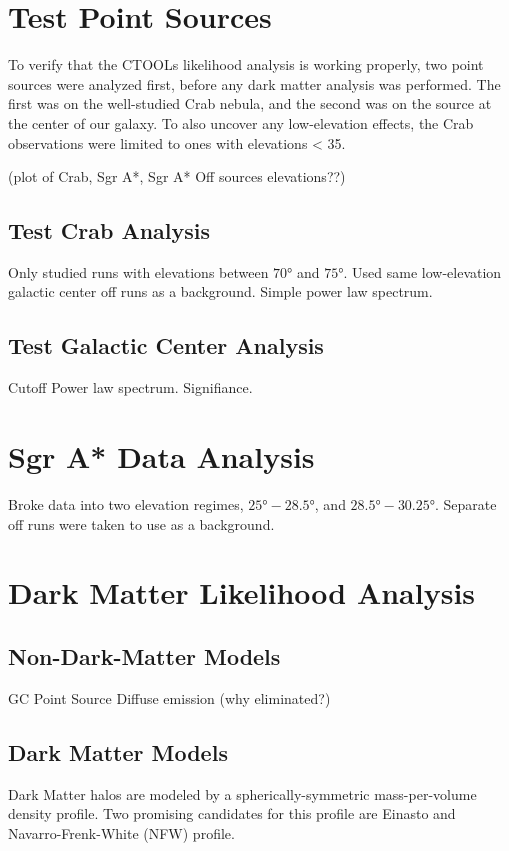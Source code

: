 \section{Test Point Sources}
To verify that the CTOOLs likelihood analysis is working properly, two point sources were analyzed first, before any dark matter analysis was performed.
The first was on the well-studied Crab nebula, and the second was on the source at the center of our galaxy.
To also uncover any low-elevation effects, the Crab observations were limited to ones with elevations < 35\degree.

(plot of Crab, Sgr A*, Sgr A* Off sources elevations??)

\subsection{Test Crab Analysis}

Only studied runs with elevations between $\ang{70}$ and $\ang{75}$.
Used same low-elevation galactic center off runs as a background.
Simple power law spectrum.

\subsection{Test Galactic Center Analysis}

Cutoff Power law spectrum.
Signifiance.

\section{Sgr A* Data Analysis}
Broke data into two elevation regimes, $ \ang{25}-\ang{28.5} $, and $ \ang{28.5}-\ang{30.25} $.
Separate off runs were taken to use as a background.


\section{Dark Matter Likelihood Analysis}

\subsection{Non-Dark-Matter Models}
GC Point Source
Diffuse emission (why eliminated?)

\subsection{Dark Matter Models}
Dark Matter halos are modeled by a spherically-symmetric mass-per-volume density profile.
Two promising candidates for this profile are Einasto and Navarro-Frenk-White (NFW) profile.

